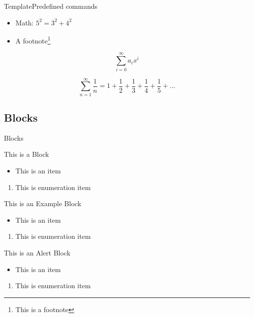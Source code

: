 \documentclass{beamer}
\begin{document}
\begin{frame}{Template}{Predefined commands}
	\begin{itemize}
		\item Math: $5^{2}=3^{2}+4^{2}$
		\item A footnote\footnote{This is a footnote}
	\end{itemize}

	\begin{equation}
 \sum_{i=0}^{\infty} a_i x^i 
\end{equation}

\begin{equation}
\sum_{n = 1}^{\infty} \frac{1}{n} = 1 + \frac{1}{2} + \frac{1}{3} + \frac{1}{4} + \frac{1}{5} + \dots 
\end{equation}

\end{frame}

\subsection{Blocks}

\begin{frame}{Blocks}
	\begin{block}{This is a Block}
		\begin{itemize}
			\item This is an item
		\end{itemize}
		\begin{enumerate}
			\item This is enumeration item
		\end{enumerate}
	\end{block}
	\begin{exampleblock}{This is an Example Block}
		\begin{itemize}
			\item This is an item
		\end{itemize}
		\begin{enumerate}
			\item This is enumeration item
		\end{enumerate}
	\end{exampleblock}
	\begin{alertblock}{This is an Alert Block}
		\begin{itemize}
			\item This is an item
		\end{itemize}
		\begin{enumerate}
			\item This is enumeration item
		\end{enumerate}
	\end{alertblock}
\end{frame}
\end{document}
